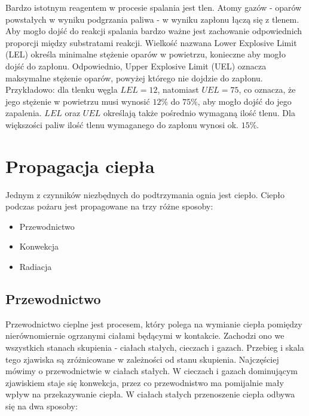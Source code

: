 Bardzo istotnym reagentem w procesie spalania jest tlen. Atomy gazów - oparów powstałych w wyniku podgrzania paliwa - w wyniku zapłonu łączą się z tlenem.
Aby mogło dojść do reakcji spalania bardzo ważne jest zachowanie odpowiednich proporcji między substratami reakcji. Wielkość nazwana Lower Explosive Limit (LEL) określa 
minimalne stężenie oparów w powietrzu, konieczne aby mogło dojść do zapłonu. Odpowiednio, Upper Explosive Limit (UEL) oznacza maksymalne stężenie oparów, powyżej
którego nie dojdzie do zapłonu. Przykładowo: dla tlenku węgla $LEL=12$, natomiast $UEL=75$, co oznacza, że jego stężenie w powietrzu musi wynosić  $12\%$ do $75\%$, aby mogło dojść
do jego zapalenia. $LEL$ oraz $UEL$ określają także pośrednio wymaganą ilość tlenu. Dla większości paliw ilość tlenu wymaganego do zapłonu wynosi ok. $15\%$. 

\section {Propagacja ciepła}
Jednym z czynników niezbędnych
do podtrzymania ognia jest ciepło. Ciepło podczas pożaru jest propagowane na trzy różne sposoby:
\begin {itemize}
\item Przewodnictwo
\item Konwekcja
\item Radiacja
\end {itemize}

\subsection {Przewodnictwo}
\label{Przewodnictwo}
 Przewodnictwo cieplne jest procesem, który polega na wymianie ciepła 
pomiędzy nierównomiernie ogrzanymi ciałami będącymi w kontakcie. Zachodzi ono we wszystkich stanach skupienia - ciałach stałych, cieczach i gazach. Przebieg i skala tego zjawiska są zróżnicowane w zależności od stanu skupienia. Najczęściej mówimy o przewodnictwie w ciałach stałych.
W cieczach i gazach dominującym zjawiskiem staje się konwekcja, przez co przewodnistwo ma pomijalnie mały wpływ na przekazywanie ciepła.
W ciałach stałych przenoszenie ciepła odbywa się  na dwa sposoby:

